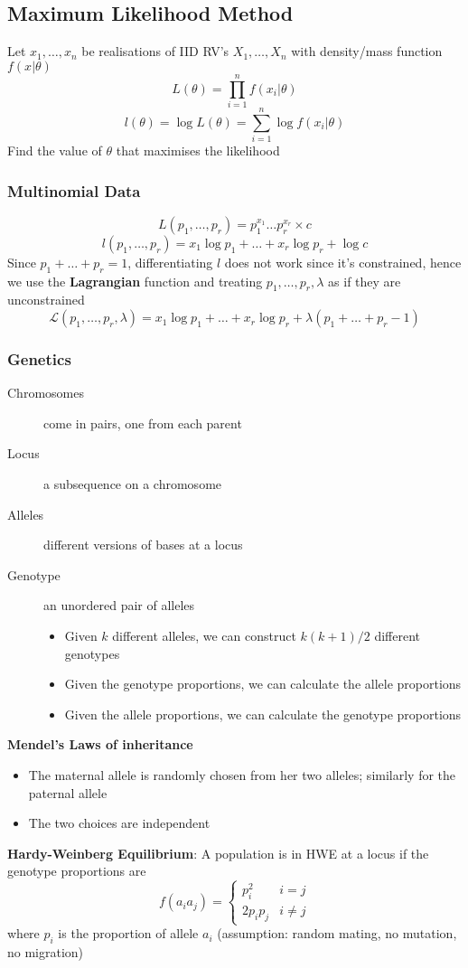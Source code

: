\documentclass{article}
\begin{document}
\begin{multicols}{2}
\subsection{Maximum Likelihood Method}
Let $x_1, \dots, x_n$ be realisations of IID RV's $X_1, \dots, X_n$ with density/mass function $f(x|\theta)$
$$L(\theta) = \prod_{i=1}^{n}f(x_i|\theta)$$
$$l(\theta) = \log{L(\theta)} = \sum_{i=1}^{n}\log f(x_i|\theta)$$
Find the value of $\theta$ that maximises the likelihood
\subsubsection{Multinomial Data}
$$L(p_1,\dots,p_r) = p_1^{x_1}\dots p_r^{x_r} \times c$$
$$l(p_1,\dots,p_r) = x_1 \log p_1 + \dots + x_r \log p_r + \log c$$
Since $p_1 + \dots + p_r = 1$, differentiating $l$ does not work since it's constrained, hence we use the \textbf{Lagrangian} function and treating $p_1, \dots, p_r, \lambda$ as if they are unconstrained
$$\mathcal{L}(p_1, \dots, p_r, \lambda) = x_1 \log p_1 + \dots + x_r \log p_r + \lambda(p_1 + \dots + p_r-  1)$$
\subsubsection{Genetics}
\begin{description}
	\item[Chromosomes] come in pairs, one from each parent
	\item[Locus] a subsequence on a chromosome
	\item[Alleles] different versions of bases at a locus
	\item[Genotype] an unordered pair of alleles
	\begin{itemize}
		\item Given $k$ different alleles, we can construct $k(k+1)/2$ different genotypes
		\item Given the genotype proportions, we can calculate the allele proportions
		\item Given the allele proportions, we can calculate the genotype proportions
	\end{itemize}
\end{description}
\textbf{Mendel's Laws of inheritance}
\begin{itemize}
	\item The maternal allele is randomly chosen from her two alleles; similarly for the paternal allele
	\item The two choices are independent
\end{itemize}
\textbf{Hardy-Weinberg Equilibrium}: A population is in HWE at a locus if the genotype proportions are
$$
f(a_ia_j) =
\left\{\begin{matrix}
p_i^2 & i = j\\
2p_ip_j & i\neq j
\end{matrix}\right.
$$
where $p_i$ is the proportion of allele $a_i$ (assumption: random mating, no mutation, no migration)


\end{multicols}
\end{document}

